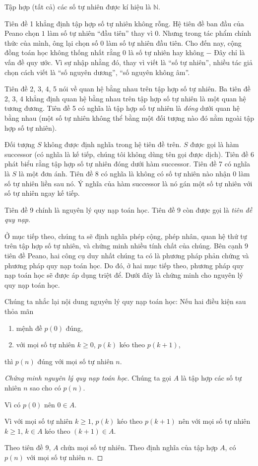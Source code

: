 Tập hợp (tất cả) các số tự nhiên được kí hiệu là $\mathbb{N}$.

Tiên đề 1 khẳng định tập hợp số tự nhiên không rỗng. Hệ tiên đề ban đầu của Peano chọn $1$ làm số tự nhiên ``đầu tiên'' thay vì $0$. Nhưng trong tác phẩm chính thức của mình, ông lại chọn số $0$ làm số tự nhiên đầu tiên. Cho đến nay, cộng đồng toán học không thống nhất rằng $0$ là số tự nhiên hay không $-$ Đây chỉ là vấn đề quy ước. Vì sự nhập nhằng đó, thay vì viết là ``số tự nhiên'', nhiều tác giả chọn cách viết là ``số nguyên dương'', ``số nguyên không âm''.

Tiên đề 2, 3, 4, 5 nói về quan hệ bằng nhau trên tập hợp số tự nhiên. Ba tiên đề 2, 3, 4 khẳng định quan hệ bằng nhau trên tập hợp số tự nhiên là một quan hệ tương đương. Tiên đề 5 có nghĩa là tập hợp số tự nhiên là \textit{đóng} dưới quan hệ bằng nhau (một số tự nhiên không thể bằng một đối tượng nào đó nằm ngoài tập hợp số tự nhiên).

Đối tượng $S$ không được định nghĩa trong hệ tiên đề trên. $S$ được gọi là hàm successor (có nghĩa là kế tiếp, chúng tôi không dùng tên gọi được dịch). Tiên đề 6 phát biểu rằng tập hợp số tự nhiên đóng dưới hàm successor. Tiên đề 7 có nghĩa là $S$ là một đơn ánh. Tiên đề 8 có nghĩa là không có số tự nhiên nào nhận $0$ làm số tự nhiên liền sau nó. Ý nghĩa của hàm successor là nó gán một số tự nhiên với số tự nhiên ngay kế tiếp.

Tiên đề 9 chính là nguyên lý quy nạp toán học. Tiên đề 9 còn được gọi là \textit{tiên đề quy nạp}.

Ở mục tiếp theo, chúng ta sẽ định nghĩa phép cộng, phép nhân, quan hệ thứ tự trên tập hợp số tự nhiên, và chứng minh nhiều tính chất của chúng. Bên cạnh 9 tiên đề Peano, hai công cụ duy nhất chúng ta có là phương pháp phản chứng và phương pháp quy nạp toán học. Do đó, ở hai mục tiếp theo, phương pháp quy nạp toán học sẽ được áp dụng triệt để. Dưới đây là chứng minh cho nguyên lý quy nạp toán học.

Chúng ta nhắc lại nội dung nguyên lý quy nạp toán học: Nếu hai điều kiện sau thỏa mãn
\begin{enumerate}[label={(\roman*)}]
    \item mệnh đề $p(0)$ đúng,
    \item với mọi số tự nhiên $k\geq 0$, $p(k)$ kéo theo $p(k+1)$,
\end{enumerate}

thì $p(n)$ đúng với mọi số tự nhiên $n$.

\begin{proof}[Chứng minh nguyên lý quy nạp toán học]
    Chúng ta gọi $A$ là tập hợp các số tự nhiên $n$ sao cho có $p(n)$.

    Vì có $p(0)$ nên $0\in A$.

    Vì với mọi số tự nhiên $k\geq 1$, $p(k)$ kéo theo $p(k+1)$ nên với mọi số tự nhiên $k\geq 1$, $k\in A$ kéo theo $(k+1)\in A$.

    Theo tiên đề 9, $A$ chứa mọi số tự nhiên. Theo định nghĩa của tập hợp $A$, có $p(n)$ với mọi số tự nhiên $n$.
\end{proof}

